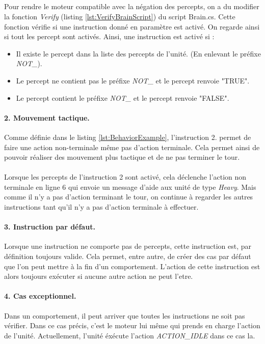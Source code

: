 \documentclass{report}
\begin{document}
\subparagraph{}Pour rendre le moteur compatible avec la négation des percepts, on a du modifier la fonction \textit{Verify} (listing \ref{lst:VerifyBrainScript}) du script Brain.cs. Cette fonction vérifie si une instruction donné en paramètre est activé. On regarde ainsi si tout les percept sont activés. \newline
Ainsi, une instruction est activé si :
\begin{itemize}
\item Il existe le percept dans la liste des percepts de l'unité. (En enlevant le préfixe \textit{NOT\_}).
\item Le percept ne contient pas le préfixe \textit{NOT\_} et le percept renvoie "TRUE".
\item Le percept contient le préfixe \textit{NOT\_} et le percept renvoie "FALSE".
\end{itemize}

\paragraph{2. Mouvement tactique.}
Comme définie dans le listing \ref{lst:BehaviorExample}, l'instruction 2. permet de faire une action non-terminale même pas d'action terminale. Cela permet ainsi de pouvoir réaliser des mouvement plus tactique et de ne pas terminer le tour.
\paragraph{}Lorsque les percepts de l'instruction 2 sont activé, cela déclenche l'action non terminale en ligne 6 qui envoie un message d'aide aux unité de type \textit{Heavy}. Mais comme il n'y a pas d'action terminant le tour, on continue à regarder les autres instructions tant qu'il n'y a pas d'action terminale à effectuer.

\paragraph{3. Instruction par défaut.}
Lorsque une instruction ne comporte pas de percepts, cette instruction est, par définition toujours valide. Cela permet, entre autre, de créer des cas par défaut que l'on peut mettre à la fin d'un comportement. L'action de cette instruction est alors toujours exécuter si aucune autre action ne peut l'etre.

\paragraph{4. Cas exceptionnel.}
Dans un comportement, il peut arriver que toutes les instructions ne soit pas vérifier. Dans ce cas précis, c'est le moteur lui même qui prends en charge l'action de l'unité. Actuellement, l'unité éxécute l'action \textit{ACTION\_IDLE} dans ce cas la.
\end{document}

